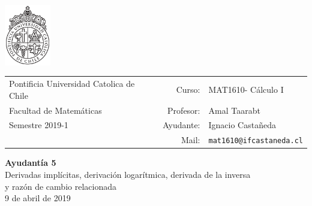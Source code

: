 \documentclass[12pt]{article}
\makeatletter
\newcommand{\ayudantia}{{\sc Ayudantía 5}}
\newcommand{\tituloayu}{Derivadas implícitas, derivación logarítmica, derivada de la inversa\\y razón de cambio relacionada}
\newcommand{\fecha}{9 de abril de 2019}
\newcommand{\sigla}{MAT1610}
\newcommand{\nombre}{Cálculo I}
\newcommand{\profesor}{Amal Taarabt}
\newcommand{\ano}{2019}
\newcommand{\semestre}{1}
\newcommand{\mail}{mat1610@ifcastaneda.cl}
\makeatother
\begin{document}
\thispagestyle{empty}

\begin{minipage}{2cm}
	\includegraphics[width=2cm]{../../../../img/logo.pdf}
	\vspace{0.5cm}
\end{minipage}
\begin{minipage}{\linewidth}
	\begin{tabular}{lrl}
		{\scriptsize\sc Pontificia Universidad Catolica de Chile} & \hspace*{0.7in}Curso: &
		\sigla  - \nombre\\
		{\sc Facultad de Matemáticas}&
		Profesor: & \profesor \\
		{\sc Semestre \ano-\semestre} & Ayudante: & {Ignacio Castañeda}\\
		& {Mail:} & \texttt{\mail}
	\end{tabular}
\end{minipage}

\vspace{-10mm}
\begin{center}
	{\LARGE\bf \ayudantia}\\
	\vspace{0.1cm}
	{\tituloayu}\\
	\vspace{0.1cm}
	\fecha\\
	\vspace{0.4cm}
\end{center}
\end{document}
